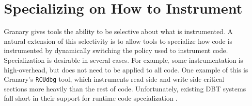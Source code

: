 \documentclass[preprint]{sigplanconf}
\begin{document}

%
%


\section{Specializing on How to Instrument}\label{sec:how}

Granary gives tools the ability to be selective about what is instrumented. A natural extension of this selectivity is to allow tools to specialize how code is instrumented by dynamically switching the policy used to instrument code. Specialization is desirable in several cases. For example, some instrumentation is high-overhead, but does not need to be applied to all code. One example of this is Granary's \texttt{RCUdbg} tool, which instruments read-side and write-side critical sections more heavily than the rest of code. Unfortunately, existing DBT systems fall short in their support for runtime code specialization \cite{DRK,btkernel,Pin,DynamoRIO}. 
\end{document}

